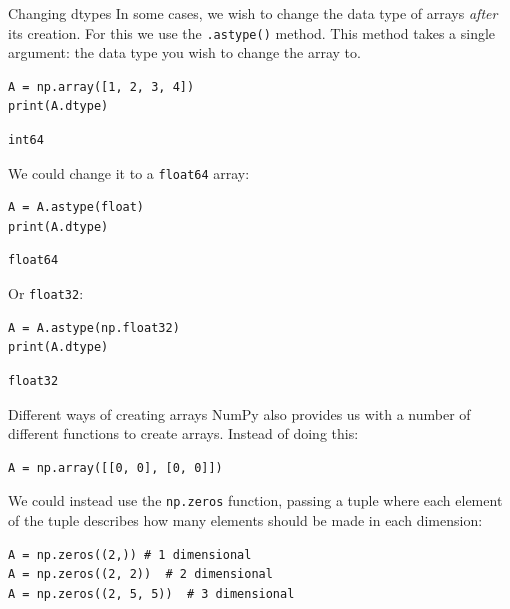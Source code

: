 \documentclass[10pt]{beamer}
\begin{document}
\begin{frame}[label={sec:org43ac423},fragile]{Changing dtypes}
 In some cases, we wish to change the data type of arrays \emph{after} its creation. For this
we use the \texttt{.astype()} method. This method takes a single argument: the data type you
wish to change the array to.

\begin{verbatim}
A = np.array([1, 2, 3, 4])
print(A.dtype)
\end{verbatim}

\begin{verbatim}
int64
\end{verbatim}


We could change it to a \texttt{float64} array:

\begin{verbatim}
A = A.astype(float)
print(A.dtype)
\end{verbatim}

\begin{verbatim}
float64
\end{verbatim}


Or \texttt{float32}:

\begin{verbatim}
A = A.astype(np.float32)
print(A.dtype)
\end{verbatim}

\begin{verbatim}
float32
\end{verbatim}
\end{frame}

\begin{frame}[label={sec:org4871d79},fragile]{Different ways of creating arrays}
 NumPy also provides us with a number of different functions to create arrays. Instead
of doing this:

\begin{verbatim}
A = np.array([[0, 0], [0, 0]])
\end{verbatim}

We could instead use the \texttt{np.zeros} function, passing a tuple where each element of
the tuple describes how many elements should be made in each dimension:

\begin{verbatim}
A = np.zeros((2,)) # 1 dimensional
A = np.zeros((2, 2))  # 2 dimensional
A = np.zeros((2, 5, 5))  # 3 dimensional
\end{verbatim}
\end{frame}
\end{document}
